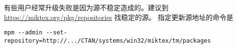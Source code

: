 有些用户经常升级失败是因为源不稳定造成的。建议到
\url{https://miktex.org/pkg/repositories} 找稳定的源。
指定更新源地址的命令是
\begin{verbatim}
mpm --admin --set-repository=http://.../CTAN/systems/win32/miktex/tm/packages
\end{verbatim}

%
%
%
%
%
%
%




